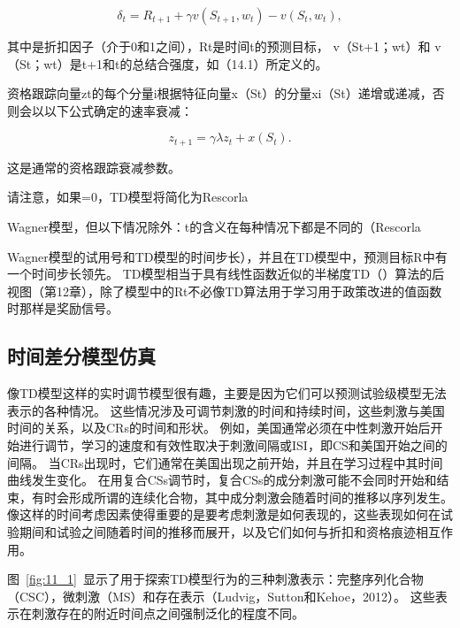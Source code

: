 {{{{{{{{{{{{{{{{	
\begin{equation}\label{key}
	\delta_t = 
		R_{t+1} + \gamma v (S_{t+1}, w_t) - v(S_t, w_t),
\end{equation}


其中是折扣因子（介于0和1之间），Rt是时间t的预测目标， v（St+1；wt）和 v（St；wt）是t+1和t的总结合强度，如（14.1）所定义的。


资格跟踪向量zt的每个分量i根据特征向量x（St）的分量xi（St）递增或递减，否则会以以下公式确定的速率衰减：

\begin{equation}\label{key}
	z_{t+1} = \gamma \lambda z_t 
		+ x(S_t).
\end{equation}

这是通常的资格跟踪衰减参数。

请注意，如果=0，TD模型将简化为Rescorla{Wagner模型，但以下情况除外：t的含义在每种情况下都是不同的（Rescorla{Wagner模型的试用号和TD模型的时间步长），并且在TD模型中，预测目标R中有一个时间步长领先。
TD模型相当于具有线性函数近似的半梯度TD（）算法的后视图（第12章），除了模型中的Rt不必像TD算法用于学习用于政策改进的值函数时那样是奖励信号。



\subsection{时间差分模型仿真}

像TD模型这样的实时调节模型很有趣，主要是因为它们可以预测试验级模型无法表示的各种情况。
这些情况涉及可调节刺激的时间和持续时间，这些刺激与美国时间的关系，以及CRs的时间和形状。
例如，美国通常必须在中性刺激开始后开始进行调节，学习的速度和有效性取决于刺激间隔或ISI，即CS和美国开始之间的间隔。
当CRs出现时，它们通常在美国出现之前开始，并且在学习过程中其时间曲线发生变化。
在用复合CSs调节时，复合CSs的成分刺激可能不会同时开始和结束，有时会形成所谓的连续化合物，其中成分刺激会随着时间的推移以序列发生。
像这样的时间考虑因素使得重要的是要考虑刺激是如何表现的，这些表现如何在试验期间和试验之间随着时间的推移而展开，以及它们如何与折扣和资格痕迹相互作用。


图~\ref{fig:11_1}~显示了用于探索TD模型行为的三种刺激表示：完整序列化合物（CSC），微刺激（MS）和存在表示（Ludvig，Sutton和Kehoe，2012）。
这些表示在刺激存在的附近时间点之间强制泛化的程度不同。


}}}}}}}}}}}}}}}}}}
